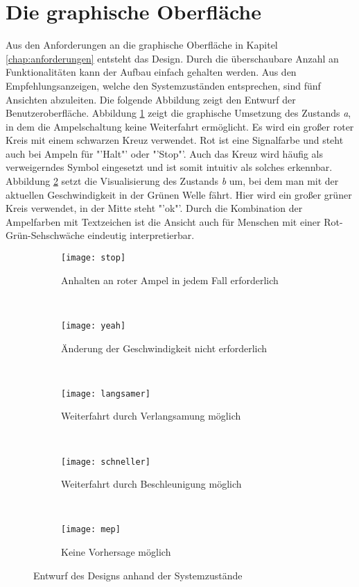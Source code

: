 \section{Die graphische Oberfläche}
Aus den Anforderungen an die graphische Oberfläche in Kapitel \ref{chap:anforderungen} entsteht das Design. Durch die überschaubare Anzahl an Funktionalitäten kann der Aufbau einfach gehalten werden. Aus den Empfehlungsanzeigen, welche den Systemzuständen entsprechen, sind fünf Ansichten abzuleiten. Die folgende Abbildung zeigt den Entwurf der Benutzeroberfläche.
Abbildung \ref{fig:stop} zeigt die graphische Umsetzung des Zustands \textit{a}, in dem die Ampelschaltung keine Weiterfahrt ermöglicht. Es wird ein großer roter Kreis mit einem schwarzen Kreuz verwendet. Rot ist eine Signalfarbe und steht auch bei Ampeln für "'Halt"' oder "'Stop"'. Auch das Kreuz wird häufig als verweigerndes Symbol eingesetzt und ist somit intuitiv als solches erkennbar.\\
Abbildung \ref{fig:yeah} setzt die Visualisierung des Zustands \textit{b} um, bei dem man mit der aktuellen Geschwindigkeit in der Grünen Welle fährt. Hier wird ein großer grüner Kreis verwendet, in der Mitte steht "'ok"'. Durch die Kombination der Ampelfarben mit Textzeichen ist die Ansicht auch für Menschen mit einer Rot-Grün-Sehschwäche eindeutig interpretierbar.\\
\begin{figure}[H]
        \centering
           \begin{subfigure}[t]{0.18\textwidth}
                \texttt{[image: stop]}
                \caption[Systemzustand a]{Anhalten an roter Ampel in jedem Fall erforderlich}
                \label{fig:stop}
        \end{subfigure}
           ~ 
              \begin{subfigure}[t]{0.18\textwidth}
                \texttt{[image: yeah]}
                \caption[Systemzustand b]{Änderung der Geschwindigkeit nicht erforderlich}
                \label{fig:yeah}
        \end{subfigure}
           ~
        \begin{subfigure}[t]{0.18\textwidth}
                \texttt{[image: langsamer]}
                \caption[Systemzustand c]{Weiterfahrt durch Verlangsamung möglich}
                \label{fig:langsamer}
        \end{subfigure}
        ~
        \begin{subfigure}[t]{0.18\textwidth}
                \texttt{[image: schneller]}
                \caption[Systemzustand d]{Weiterfahrt durch Beschleunigung möglich}
                \label{fig:schneller}
        \end{subfigure} 
        ~ 
        \begin{subfigure}[t]{0.18\textwidth}
        	\texttt{[image: mep]}
        	\caption[Systemzustand e]{Keine Vorhersage möglich}
            \label{fig:meh}
        \end{subfigure} 
        \grayRule
        \caption[Systemzustände im Ampelbereich]{Entwurf des Designs anhand der Systemzustände}
        \label{fig:mockup}
\end{figure}
